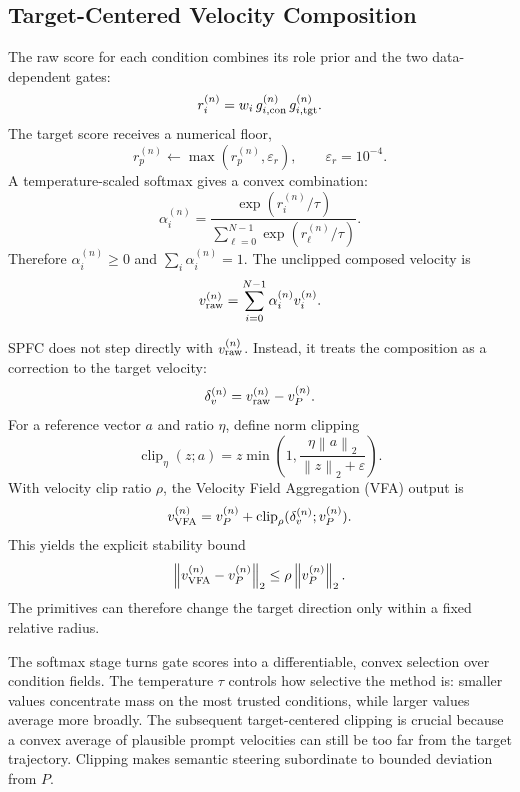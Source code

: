 \documentclass[letterpaper]{article} %
\newcommand{\clip}{\operatorname{clip}}
\newcommand{\norm}[1]{\left\lVert #1 \right\rVert_2}
\newcommand{\eps}{\varepsilon}
\begin{document}
\subsection{Target-Centered Velocity Composition}

The raw score for each condition combines its role prior and the two
data-dependent gates:
\begin{equation}
r_i^{(n)}
=w_i\,g_{i,{\rm con}}^{(n)}\,g_{i,{\rm tgt}}^{(n)} .
\end{equation}
The target score receives a numerical floor,
\begin{equation}
r_p^{(n)}\leftarrow\max(r_p^{(n)},\eps_r),\qquad
\eps_r=10^{-4}.
\end{equation}
A temperature-scaled softmax gives a convex combination:
\begin{equation}
\alpha_i^{(n)}
=
\frac{\exp(r_i^{(n)}/\tau)}
{\sum_{\ell=0}^{N-1}\exp(r_\ell^{(n)}/\tau)}.
\end{equation}
Therefore $\alpha_i^{(n)}\geq0$ and $\sum_i\alpha_i^{(n)}=1$. The
unclipped composed velocity is
\begin{equation}
v_{\rm raw}^{(n)}
=
\sum_{i=0}^{N-1}\alpha_i^{(n)}v_i^{(n)}.
\end{equation}

SPFC does not step directly with $v_{\rm raw}^{(n)}$. Instead, it treats
the composition as a correction to the target velocity:
\begin{equation}
\delta_v^{(n)}=v_{\rm raw}^{(n)}-v_P^{(n)}.
\end{equation}
For a reference vector $a$ and ratio $\eta$, define norm clipping
\begin{equation}
\clip_\eta(z;a)
=
z\min\!\left(1,\frac{\eta\norm{a}}{\norm{z}+\eps}\right).
\end{equation}
With velocity clip ratio $\rho$, the Velocity Field Aggregation (VFA)
output is
\begin{equation}
v_{\rm VFA}^{(n)}
=v_P^{(n)}+\clip_\rho(\delta_v^{(n)};v_P^{(n)}).
\end{equation}
This yields the explicit stability bound
\begin{equation}
\norm{v_{\rm VFA}^{(n)}-v_P^{(n)}}
\leq \rho\norm{v_P^{(n)}}.
\end{equation}
The primitives can therefore change the target direction only within a
fixed relative radius.

The softmax stage turns gate scores into a differentiable, convex
selection over condition fields. The temperature $\tau$ controls how
selective the method is: smaller values concentrate mass on the most
trusted conditions, while larger values average more broadly. The
subsequent target-centered clipping is crucial because a convex average
of plausible prompt velocities can still be too far from the target
trajectory. Clipping makes semantic steering subordinate to bounded
deviation from $P$.
\end{document}

